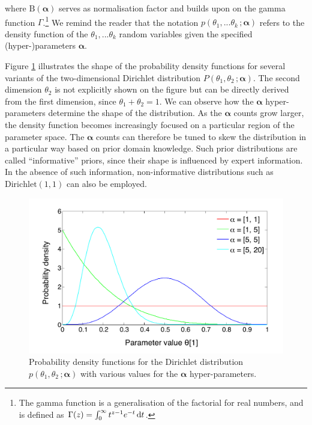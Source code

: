 where $ \mathrm{B}(\boldsymbol\alpha)$ serves as normalisation factor and builds upon on the gamma function $\Gamma$.\footnote{The gamma function is a generalisation of the factorial for real numbers, and is defined as $\Gamma(z) = \int_0^\infty  t^{z-1} e^{-t}\,{\rm d}t$.} We remind the reader that the notation $p(\theta_1,...\theta_k\,; \boldsymbol\alpha)$ refers to the density function of the $\theta_1,... \theta_k$ random variables given the specified (hyper-)parameters $\boldsymbol\alpha$. 

Figure \ref{fig:dirichletfun} illustrates the shape of the probability density functions for several variants of the two-dimensional Dirichlet distribution $P(\theta_1,\theta_2\,; \boldsymbol\alpha)$.  The second dimension $\theta_2$ is not explicitly shown on the figure but can be directly derived from the first dimension, since $\theta_1 + \theta_2=1$.  We can observe how the $\boldsymbol\alpha$ hyper-parameters determine the shape of the distribution. As the $\boldsymbol\alpha$ counts grow larger, the density function becomes increasingly focused on a particular region of the parameter space.  The $\boldsymbol\alpha$ counts can therefore be tuned to skew the distribution in a particular way based on prior domain knowledge. Such prior distributions are called ``informative'' priors, since their shape is influenced by expert information. In the absence of such information, non-informative distributions such as $\mathrm{Dirichlet}(1,1)$ can also be employed. 

\begin{figure}[h]
\centering
\includegraphics[scale=0.45]{imgs/dirichletfun.pdf}
\caption{Probability density functions for the Dirichlet distribution $p(\theta_1, \theta_2\,; \boldsymbol\alpha)$  with various values for the $\boldsymbol\alpha$ hyper-parameters.}
\label{fig:dirichletfun}
\end{figure}

